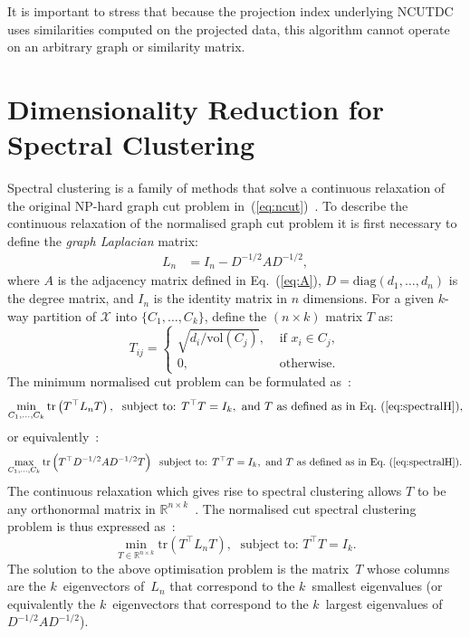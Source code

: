\documentclass{book}
\def\R{\mathbb{R}}
\def\tr#1{\mathrm{tr}\left(#1\right)}
\begin{document}
\noindent
%
It is important to stress that because the projection index underlying NCUTDC
uses similarities computed on the projected data, this algorithm cannot operate
on an arbitrary graph or similarity matrix.




\section{Dimensionality Reduction for Spectral Clustering}

Spectral clustering is a family of methods that solve a continuous relaxation
of the original NP-hard graph cut problem in~(\ref{eq:ncut})~\cite{HagenK1992,ShiM2000,Luxburg2007}. 
%
To describe the continuous relaxation of the normalised graph cut problem it is first necessary to
define the \emph{graph Laplacian} matrix:
%
\begin{align*}
%
L_n &= I_n - D^{-1/2}AD^{-1/2},
%
\end{align*} 
where $A$ is the adjacency matrix defined in Eq.~(\ref{eq:A}),
$D = \textrm{diag}(d_1,\ldots,d_n)$ is the degree matrix, and $I_n$ is the identity matrix
in $n$ dimensions.
%
For a given $k$-way partition of $\mathcal{X}$ into $\{C_1,\ldots,C_k\}$, define the $(n \times k)$ matrix
$T$ as:
%
\begin{equation}\label{eq:spectralH}
%
T_{ij} = \left\{ \begin{array}{ll} \sqrt{d_i/ \mathrm{vol}(C_j)}, & \textrm{ if } x_i \in C_j, \\
	0, & \textrm{ otherwise}. \end{array} \right.
%
\end{equation}
The minimum normalised cut problem can be formulated as~\cite{ShiM2000}:
%
\[
%
\min_{C_1,\ldots,C_k} \tr{T^\top L_n T}, \; \textrm{ subject to: } T^\top T = I_k, 
	\textrm{ and } T \textrm{ as defined as in Eq.~(\ref{eq:spectralH})},
%
\]
%
or equivalently~\cite{NgJW2001}:
\[
%
\max_{C_1,\ldots,C_k} \tr{T^\top D^{-1/2} A D^{-1/2} T} \; \textrm{ subject to: } T^\top T = I_k,
	\textrm{ and } T \textrm{ as defined as in Eq.~(\ref{eq:spectralH})}.
%
\]
%
The continuous relaxation which gives rise to spectral clustering 
allows $T$ to
be any orthonormal matrix in $\R^{n \times k}$~\cite{Luxburg2007}. 
The normalised cut spectral clustering problem is thus expressed as~\cite{ShiM2000}:
\[
\min_{T \in \R^{n \times k}} \tr{T^\top L_n T}, \; \textrm{ subject to: } T^\top T = I_k.
\]
The solution to the above optimisation problem is the matrix~$T$ whose columns 
are the $k$~eigenvectors of~$L_n$ that correspond to the $k$~smallest
eigenvalues (or equivalently the $k$~eigenvectors that correspond to the $k$~largest
eigenvalues of $D^{-1/2} A D^{-1/2}$).
%
\end{document}
